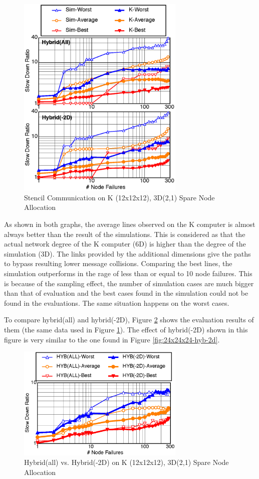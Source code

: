 \documentclass[Afour,times,sageh]{sagej}
\begin{document}
\begin{figure}[ht]
\centering
\includegraphics[width=80mm]{Figs/K-Stencil-CL.eps}
  \caption{Stencil Communication on K (12x12x12), 3D(2,1) Spare Node
    Allocation}
  \label{fig:k-stencil}
\end{figure}

As shown in both graphs, the average lines observed on the K computer
is almost always better than the result of the simulations. This is
considered as that the actual network degree of the K computer (6D) is
higher than the degree of the simulation (3D). The links provided by
the additional dimensions give the paths to bypass resulting lower
message collisions. Comparing the best lines, the simulation
outperforms in the rage of less than or equal to 10 node
failures. This is because of the sampling effect, the number of
simulation cases are much bigger than that of evaluation and the best
cases found in the simulation could not be found in the
evaluations. The same situation happens on the worst cases.

To compare hybrid(all) and hybrid(-2D), Figure \ref{fig:k-comparison}
shows the evaluation results of them (the same data used in Figure
\ref{fig:k-stencil}). The effect of hybrid(-2D) shown in this figure
is very similar to the one found in Figure \ref{fig:24x24x24-hyb-2d}.

\begin{figure}[ht]
\centering
\includegraphics[width=80mm]{Figs/K-comparison-CL.eps}
  \caption{Hybrid(all) vs. Hybrid(-2D) on K (12x12x12), 3D(2,1) Spare Node
    Allocation}
  \label{fig:k-comparison}
\end{figure}
\end{document}
